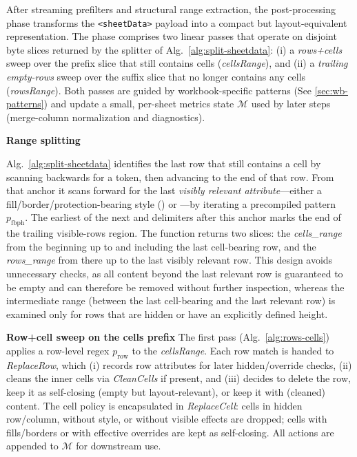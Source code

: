 \documentclass[conference]{IEEEtran}
\newcommand{\code}[1]{\text{\footnotesize\texttt{\detokenize{#1}}}}
\begin{document}
\noindent
After streaming prefilters and structural range extraction, the post-processing
phase transforms the \texttt{<sheetData>} payload into a compact but
layout-equivalent representation. The phase comprises two linear passes that
operate on disjoint byte slices returned by the splitter of
Alg.~\ref{alg:split-sheetdata}:
(i) a \emph{rows+cells} sweep over the prefix slice that still contains cells
(\emph{cellsRange}), and (ii) a \emph{trailing empty-rows} sweep over the
suffix slice that no longer contains any cells (\emph{rowsRange}).
Both passes are guided by workbook-specific patterns (See \ref{sec:wb-patterns}) and update a small, per-sheet metrics state $\mathcal{M}$ used by later
steps (merge-column normalization and diagnostics).

\textbf{Range splitting}

Alg.~\ref{alg:split-sheetdata} identifies the last row that still contains a
cell by scanning backwards for a  token, then advancing to the
end of that row. From that anchor it scans forward for the last
\emph{visibly relevant attribute}---either a fill/border/protection-bearing style
(\code{s="FBP"}) or ---by iterating a precompiled pattern
\mbox{$p_{\mathrm{fbph}}$}. The earliest of the next
 and \xtag{/>} delimiters after this anchor marks the end of the
trailing visible-rows region. The function returns two slices: the \emph{cells_range} from the beginning up to and including
the last cell-bearing row, and the \emph{rows_range} from there up to the last
visibly relevant row. This design avoids unnecessary
checks, as all content beyond the last relevant row is guaranteed to be
empty and can therefore be removed without further inspection, whereas the
intermediate range (between the last cell-bearing and the last relevant row)
is examined only for rows that are hidden or have an explicitly defined
height.

\textbf{Row+cell sweep on the cells prefix}
The first pass (Alg.~\ref{alg:rows-cells}) applies a row-level regex
\mbox{$p_{\text{row}}$} to the \emph{cellsRange}. Each row match is handed to
\emph{ReplaceRow}, which (i) records row
attributes for later hidden/override checks, (ii) cleans the inner
cells via \emph{CleanCells} if present,
and (iii) decides to delete the row, keep it as self-closing (empty but
layout-relevant), or keep it with (cleaned) content. The cell
policy is encapsulated in \emph{ReplaceCell}:
cells in hidden row/column, without style, or without visible effects are
dropped; cells with fills/borders or with effective overrides are kept as
self-closing. All actions are appended to $\mathcal{M}$ for downstream use.
\end{document}
